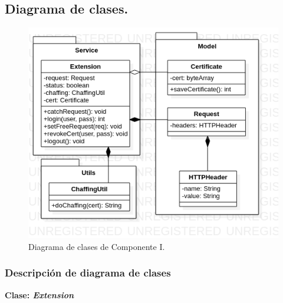 \documentclass[12pt, a4paper, titlepage]{report}
\begin{document}
			   
			   
			\subsection{Diagrama de clases.}
			
    			\begin{figure}[H]
    				\begin{center}	\includegraphics[width=14cm]{./imagenes/Disenio/Componente_1/CI_CD.png}
    				\caption{Diagrama de clases de Componente I.}
    				\end{center}
    			\end{figure}
			    
			    \subsubsection{Descripción de diagrama de clases}
			    
			       	\textbf{\textcolor{guindapoli}{Clase: \textit{Extension}}}\\
                    
\end{document}
